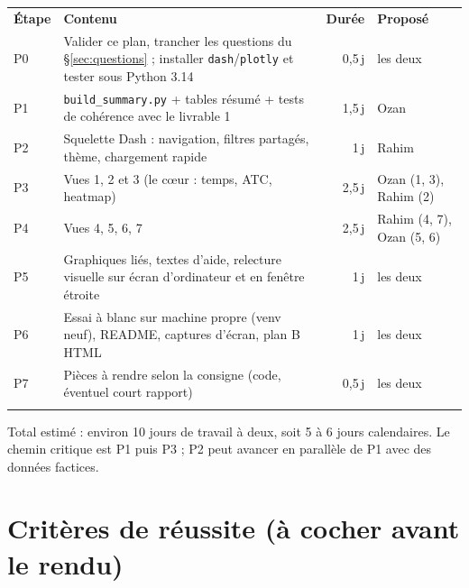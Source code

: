 \documentclass[10.5pt, a4paper]{article}
\newcommand{\entete}[1]{\textbf{\color{gris!20!black}#1}}
\newcommand{\filet}{\arrayrulecolor{gris!40}\hline}
\begin{document}
\begin{tabularx}{\linewidth}{>{\raggedright\arraybackslash}p{0.8cm} >{\raggedright\arraybackslash}X r >{\raggedright\arraybackslash}p{2.3cm}}
\rowcolor{gris!14}\entete{Étape} & \entete{Contenu} & \entete{Durée} & \entete{Proposé}\\
P0 & Valider ce plan, trancher les questions du §\ref{sec:questions} ; installer \texttt{dash}/\texttt{plotly} et tester sous Python 3.14 & 0,5\,j & les deux \\
P1 & \texttt{build\_summary.py} + tables résumé + tests de cohérence avec le livrable 1 & 1,5\,j & Ozan \\
P2 & Squelette Dash : navigation, filtres partagés, thème, chargement rapide & 1\,j & Rahim \\
P3 & Vues 1, 2 et 3 (le cœur : temps, ATC, heatmap) & 2,5\,j & Ozan (1, 3), Rahim (2) \\
P4 & Vues 4, 5, 6, 7 & 2,5\,j & Rahim (4, 7), Ozan (5, 6) \\
P5 & Graphiques liés, textes d'aide, relecture visuelle sur écran d'ordinateur et en fenêtre étroite & 1\,j & les deux \\
P6 & Essai à blanc sur machine propre (venv neuf), README, captures d'écran, plan B HTML & 1\,j & les deux \\
P7 & Pièces à rendre selon la consigne (code, éventuel court rapport) & 0,5\,j & les deux \\
\filet
\end{tabularx}

Total estimé : environ 10 jours de travail à deux, soit 5 à 6 jours calendaires. Le chemin critique est P1 puis P3 ;
P2 peut avancer en parallèle de P1 avec des données factices.

\section{Critères de réussite (à cocher avant le rendu)}
\end{document}

